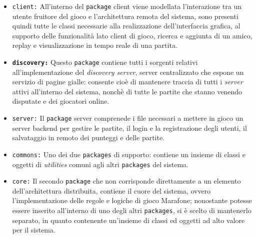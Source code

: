     \begin{itemize}
    \item{\texttt{client:\/}} All'interno del \texttt{package} client viene modellata l'interazione tra un utente fruitore del gioco e
    l'architettura remota del sistema, sono presenti quindi tutte le classi necessarie alla realizzazione dell'interfaccia grafica, al supporto delle funzionalità lato client di gioco, ricerca e aggiunta di un amico, replay e visualizzazione in tempo reale di una partita.


    \item{\textbf{\texttt{discovery:\/}}}
      Questo \texttt{package} contiene tutti i sorgenti relativi all'implementazione del \textit{discovery server},
      server centralizzato che espone un servizio di pagine gialle: consente cioè di mantenere traccia di tutti i \textit{server} attivi
      all'interno del sistema, nonchè di tutte le partite che stanno venendo disputate e dei giocatori online.

    \item{\texttt{server:\/}}
      Il \texttt{package} server comprenede i file necessari a mettere in gioco un server backend per gestire le partite,
      il login e la registrazione degli utenti, il salvataggio in remoto dei punteggi e delle partite.

    \item{\texttt{commons:\/}}
      Uno dei due \texttt{packages} di supporto: contiene un insieme di classi e oggetti di \textit{utilities} comuni agli altri \texttt{packages} del sistema.

    \item{\texttt{core:\/}}
      Il secondo \texttt{package} che non corrisponde direttamente a un elemento dell'architettura distribuita, contiene il cuore del sistema, ovvero l'implementazione delle regole e logiche di gioco Marafone; nonostante potesse essere inserito all'interno di uno degli altri \texttt{packages}, si è scelto di mantenerlo separato, in quanto contenente un'insieme di classi ed oggetti ad alto valore per il sistema.

  \end{itemize}

